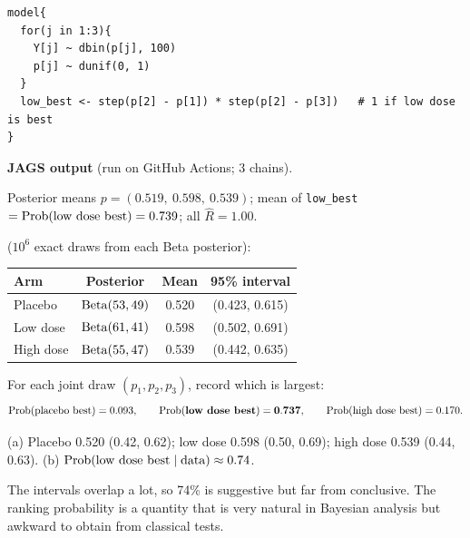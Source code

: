 \documentclass[11pt]{article}
\newenvironment{jagsbox}{\begin{sanity}\small\textbf{JAGS output} (run on GitHub Actions; 3 chains).\par\smallskip\centering}{\end{sanity}}
\newcommand{\JAGSexfourteen}{\begin{jagsbox}
Posterior means $p=(0.519,\ 0.598,\ 0.539)$; mean of \texttt{low\_best} $=\Prob(\text{low dose best})=0.739$; all $\hat R=1.00$.
\end{jagsbox}}
\begin{document}
\solution
{}
\begin{lstlisting}
model{
  for(j in 1:3){
    Y[j] ~ dbin(p[j], 100)
    p[j] ~ dunif(0, 1)
  }
  low_best <- step(p[2] - p[1]) * step(p[2] - p[3])   # 1 if low dose is best
}
\end{lstlisting}
\JAGSexfourteen
{} ($10^6$ exact draws from each Beta posterior):
\begin{center}
\begin{tabular}{lccc}\toprule
Arm & Posterior & Mean & 95\% interval\\\midrule
Placebo & $\mathrm{Beta}(53,49)$ & 0.520 & (0.423, 0.615)\\
Low dose & $\mathrm{Beta}(61,41)$ & 0.598 & (0.502, 0.691)\\
High dose & $\mathrm{Beta}(55,47)$ & 0.539 & (0.442, 0.635)\\\bottomrule
\end{tabular}
\end{center}
 For each joint draw $(p_1,p_2,p_3)$, record which is largest:
\[
\mathrm{Prob}(\text{placebo best})=0.093,\qquad\mathrm{Prob}(\textbf{low dose best})=\mathbf{0.737},\qquad\mathrm{Prob}(\text{high dose best})=0.170.
\]

\begin{answer}
(a) Placebo 0.520 (0.42, 0.62); low dose 0.598 (0.50, 0.69); high dose 0.539 (0.44, 0.63). \quad (b) $\mathrm{Prob}(\text{low dose best}\mid\text{data})\approx0.74$.
\end{answer}

\begin{takeaway}
The intervals overlap a lot, so 74\% is suggestive but far from conclusive. The ranking probability is a quantity that is very natural in Bayesian analysis but awkward to obtain from classical tests.
\end{takeaway}

\end{document}

